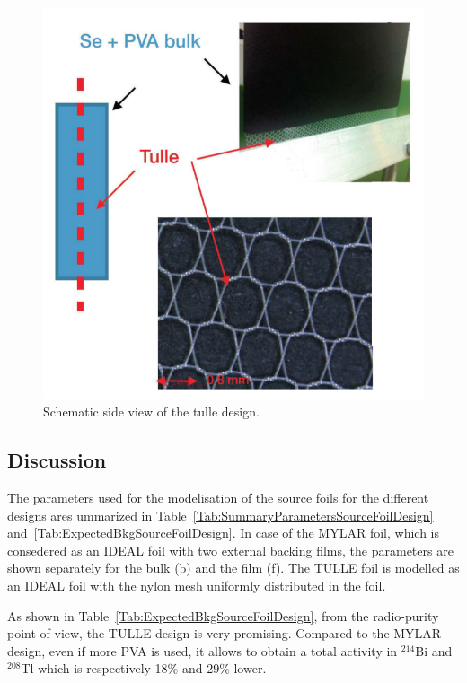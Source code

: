 \documentclass[main.tex]{subfiles}
\begin{document}
\begin{figure}[h!]
\centering
\includegraphics[scale=0.2]{pictures/Chap4/TulleDesign.png}
\caption{Schematic side view of the tulle design.}
\label{TulleDesign}
\end{figure}


\subsection{Discussion}


\NI The parameters used for the modelisation of the source foils for the different designs ares ummarized in Table~\ref{Tab:SummaryParametersSourceFoilDesign} and~\ref{Tab:ExpectedBkgSourceFoilDesign}. In case of the MYLAR foil, which is consedered as an IDEAL foil with two external backing films, the parameters are shown separately for the bulk (b) and the film (f). The TULLE foil is modelled as an IDEAL foil with the nylon mesh uniformly distributed in the foil.


\bigskip


\NI As shown in Table~\ref{Tab:ExpectedBkgSourceFoilDesign}, from the radio-purity point of view, the TULLE design is very promising. Compared to the MYLAR design, even if more PVA is used, it allows to obtain a total activity in $^{\text{214}}$Bi and $^{\text{208}}$Tl which is respectively 18\% and 29\% lower. 
\end{document}
